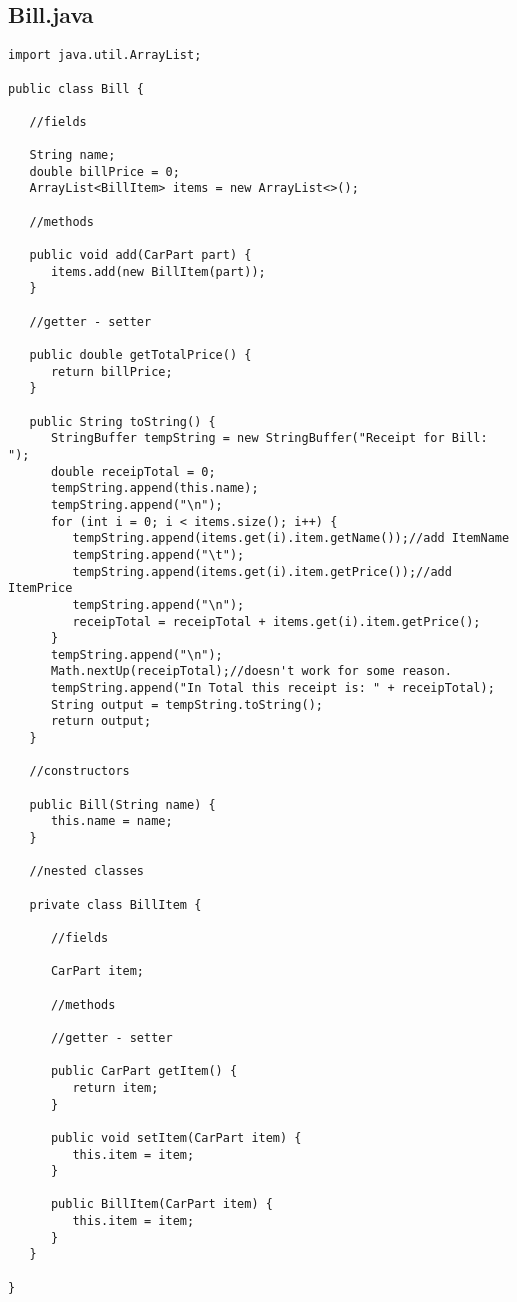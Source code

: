 \documentclass[12pt,a4paper,oneside,ngerman]{article}
\begin{document}
\subsection*{Bill.java}
\begin{lstlisting}
import java.util.ArrayList;

public class Bill {

   //fields

   String name;
   double billPrice = 0;
   ArrayList<BillItem> items = new ArrayList<>();

   //methods

   public void add(CarPart part) {
      items.add(new BillItem(part));
   }

   //getter - setter

   public double getTotalPrice() {
      return billPrice;
   }

   public String toString() {
      StringBuffer tempString = new StringBuffer("Receipt for Bill: ");
      double receipTotal = 0;
      tempString.append(this.name);
      tempString.append("\n");
      for (int i = 0; i < items.size(); i++) {
         tempString.append(items.get(i).item.getName());//add ItemName
         tempString.append("\t");
         tempString.append(items.get(i).item.getPrice());//add ItemPrice
         tempString.append("\n");
         receipTotal = receipTotal + items.get(i).item.getPrice();
      }
      tempString.append("\n");
      Math.nextUp(receipTotal);//doesn't work for some reason.
      tempString.append("In Total this receipt is: " + receipTotal);
      String output = tempString.toString();
      return output;
   }

   //constructors

   public Bill(String name) {
      this.name = name;
   }

   //nested classes

   private class BillItem {

      //fields

      CarPart item;

      //methods

      //getter - setter

      public CarPart getItem() {
         return item;
      }

      public void setItem(CarPart item) {
         this.item = item;
      }

      public BillItem(CarPart item) {
         this.item = item;
      }
   }

}

\end{lstlisting}
\end{document}
